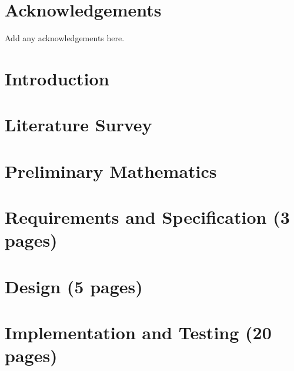 
\maketitle
\newpage


\newpage


\declaration{\disstitle}{\authorname} %
\newpage


\abstract

\newpage


\tableofcontents
\newpage
\listoffigures
\newpage
\listoftables
\newpage


\chapter*{Acknowledgements}
Add any acknowledgements here.
\newpage


\setcounter{page}{1}



\chapter{Introduction}

\chapter{Literature Survey}

\chapter{Preliminary Mathematics}


\chapter{Requirements and Specification (3 pages)}


\chapter{Design (5 pages)}


\chapter{Implementation and Testing (20 pages)}


